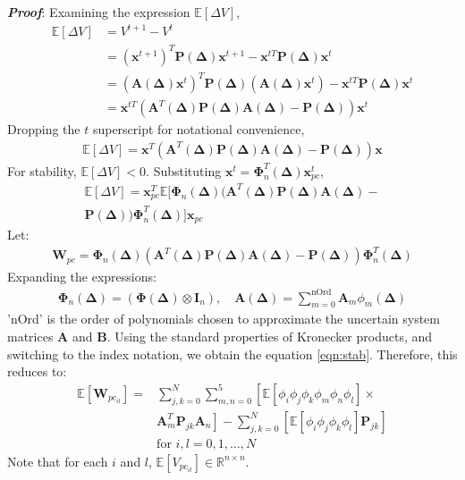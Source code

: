 \documentclass[letterpaper, 10 pt, conference]{ieeeconf}  %
\newcommand{\real}{\mathbb{R}}
\newcommand{\vo}[1]{\boldsymbol{#1}}
\newcommand{\Del}{\vo{\Delta}}
\begin{document}
\textbf{\textit{Proof}}: Examining the expression $\mathbb{E}[\Delta V]$,
\begin{align*}
  \mathbb{E}[\Delta V] &= V^{t+1} - V^{t} \\
  &= (\vo{x}^{t+1})^T \vo{P}(\Del) \vo{x}^{t+1} - \vo{x}^{tT} \vo{P}(\Del) \vo{x}^t \\
  &= (\vo{A}(\Del)  \vo{x}^t)^T \vo{P}(\Del)(\vo{A}(\Del) \vo{x}^t) -  \vo{x}^{tT} \vo{P}(\Del) \vo{x}^t \\
  &=  \vo{x}^{tT}( \vo{A}^T (\Del)\vo{P}(\Del) \vo{A} (\Del)- \vo{P}(\Del)) \vo{x}^t
\end{align*}
Dropping the $t$ superscript for notational convenience,
\begin{align*}
  \mathbb{E}[\Delta V] = \vo{x}^T (\vo{A}^T(\Del) \vo{P}(\Del) \vo{A} (\Del)- \vo{P}(\Del))\vo{x}
\end{align*}
For stability,
  $\mathbb{E}[\Delta V] < 0$.
Substituting $\vo{x}^t = \vo{\Phi}_n^T(\vo{\Delta})\vo{x}_{pc}^t$,
\begin{align}
  \mathbb{E}[\Delta V] = \vo{x}_{pc}^T \mathbb{E}[\vo{\Phi}_n(\vo{\Delta})(\vo{A}^T (\Del)\vo{P}(\Del) \vo{A}(\Del) - \nonumber\\ \vo{P}(\Del)) \vo{\Phi}_n^T (\Del)] \vo{x}_{pc}
\end{align}
Let:
\begin{align*}
        \vo{W}_{pc} = \vo{\Phi}_n(\vo{\Delta})(\vo{A}^T (\Del)\vo{P}(\Del) \vo{A}(\Del) - \vo{P}(\Del)) \vo{\Phi}_n^T (\Del)%
\end{align*}
Expanding the expressions:
\begin{align*}
        \vo{\Phi}_n (\Del) = (\vo{\Phi} (\Del) \otimes \vo{I}_n), \quad
        \vo{A}(\Del) = \sum_{m=0}^{\textrm{nOrd}} \vo{A}_m \phi_m(\Del)
\end{align*}
'$\textrm{nOrd}$' is the order of polynomials chosen to approximate the uncertain system matrices $\vo{A}$ and $\vo{B}$.
Using the standard properties of Kronecker products, and switching to the index notation, we obtain the equation \eqref{eqn:stab}. Therefore, this reduces to:
\begin{align*}
        \mathbb{E} [\vo{W}_{pc_{il}}] = &\sum_{j,k = 0}^{N} \sum_{m,n = 0}^{5} \left[ \mathbb{E}[\phi_i \phi_j \phi_k \phi_m \phi_n \phi_l] \times \right. \nonumber\\
        & \left. \vo{A}_m^T \vo{P}_{jk} \vo{A}_n \right] %
        - \sum_{j,k = 0}^{N} \left[ \mathbb{E}[\phi_i \phi_j \phi_k \phi_l] \vo{P}_{jk} \right] \nonumber\\
        &\textrm{for } i, l=0,1,\hdots,N
\end{align*}
Note that for each $i$ and $l$, $\mathbb{E}[V_{pc_{il}}] \in \real^{n \times n}$.
\end{document}
